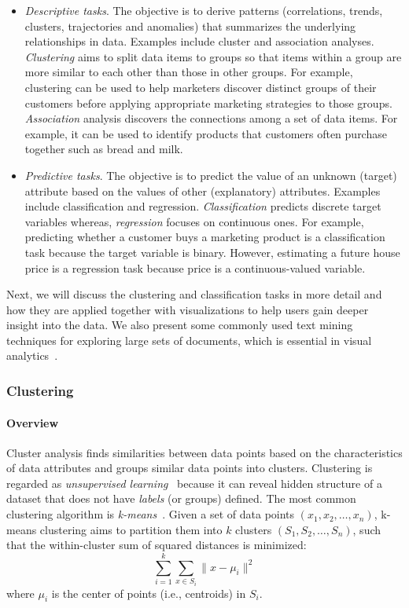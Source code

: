 \begin{itemize}
		\item \emph{Descriptive tasks}. The objective is to derive patterns (correlations, trends, clusters, trajectories and anomalies) that summarizes the underlying relationships in data. Examples include cluster and association analyses. \emph{Clustering} aims to split data items to groups so that items within a group are more similar to each other than those in other groups. For example, clustering can be used to help marketers discover distinct groups of their customers before applying appropriate marketing strategies to those groups. \emph{Association} analysis discovers the connections among a set of data items. For example, it can be used to identify products that customers often purchase together such as bread and milk.
		
		\item \emph{Predictive tasks}. The objective is to predict the value of an unknown (target) attribute based on the values of other (explanatory) attributes. Examples include classification and regression. \emph{Classification} predicts discrete target variables whereas, \emph{regression} focuses on continuous ones. For example, predicting whether a customer buys a marketing product is a classification task because the target variable is binary. However, estimating a future house price is a regression task because price is a continuous-valued variable.
\end{itemize}

Next, we will discuss the clustering and classification tasks in more detail and how they are applied together with visualizations to help users gain deeper insight into the data. We also present some commonly used text mining techniques for exploring large sets of documents, which is essential in visual analytics~\cite{Thomas2005}.

\subsubsection{Clustering}

\paragraph{Overview}
Cluster analysis finds similarities between data points based on the characteristics of data attributes and groups similar data points into clusters. Clustering is regarded as \emph{unsupervised learning}~\cite{Han2011} because it can reveal hidden structure of a dataset that does not have \emph{labels} (or groups) defined. The most common clustering algorithm is \emph{k-means}~\cite{Lloyd1982}. Given a set of data points $(x_1, x_2, \dots, x_n)$, k-means clustering aims to partition them into $k$ clusters $(S_1, S_2, \dots, S_n)$, such that the within-cluster sum of squared distances is minimized: 
\[
\sum_{i=1}^k\sum_{x\in S_i} \lVert x-\mu_i \rVert^2
\]
where $\mu_i$ is the center of points (i.e., centroids) in $S_i$. 

